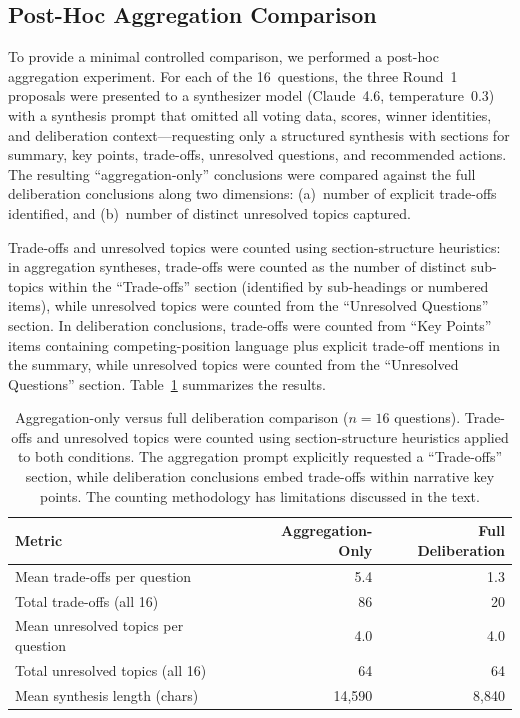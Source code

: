 \documentclass[11pt,a4paper]{article}
\begin{document}
\subsection{Post-Hoc Aggregation Comparison}
\label{sec:aggregation}

To provide a minimal controlled comparison, we performed a post-hoc aggregation experiment. For each of the 16~questions, the three Round~1 proposals were presented to a synthesizer model (Claude~4.6, temperature~0.3) with a synthesis prompt that omitted all voting data, scores, winner identities, and deliberation context---requesting only a structured synthesis with sections for summary, key points, trade-offs, unresolved questions, and recommended actions. The resulting ``aggregation-only'' conclusions were compared against the full deliberation conclusions along two dimensions: (a)~number of explicit trade-offs identified, and (b)~number of distinct unresolved topics captured.

Trade-offs and unresolved topics were counted using section-structure heuristics: in aggregation syntheses, trade-offs were counted as the number of distinct sub-topics within the ``Trade-offs'' section (identified by sub-headings or numbered items), while unresolved topics were counted from the ``Unresolved Questions'' section. In deliberation conclusions, trade-offs were counted from ``Key Points'' items containing competing-position language plus explicit trade-off mentions in the summary, while unresolved topics were counted from the ``Unresolved Questions'' section. Table~\ref{tab:aggregation_results} summarizes the results.

\begin{table}[ht]
\centering
\caption{Aggregation-only versus full deliberation comparison ($n = 16$ questions). Trade-offs and unresolved topics were counted using section-structure heuristics applied to both conditions. The aggregation prompt explicitly requested a ``Trade-offs'' section, while deliberation conclusions embed trade-offs within narrative key points. The counting methodology has limitations discussed in the text.}
\label{tab:aggregation_results}
\begin{tabular}{@{}lrr@{}}
\toprule
\textbf{Metric} & \textbf{Aggregation-Only} & \textbf{Full Deliberation} \\
\midrule
Mean trade-offs per question & 5.4 & 1.3 \\
Total trade-offs (all 16) & 86 & 20 \\
Mean unresolved topics per question & 4.0 & 4.0 \\
Total unresolved topics (all 16) & 64 & 64 \\
Mean synthesis length (chars) & 14{,}590 & 8{,}840 \\
\bottomrule
\end{tabular}
\end{table}
\end{document}
